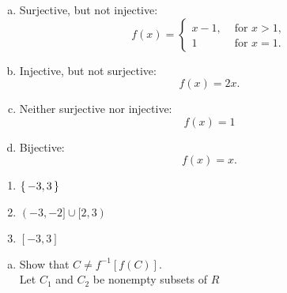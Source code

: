 \documentclass[12pt]{scrartcl} %
\begin{document}
\begin{enumerate}[(a)]
\item Surjective, but not injective:
\begin{equation}
f(x) = 
\begin{cases}
x - 1, & \text{ for } x > 1, \\
1 & \text{ for } x = 1.

\end{cases}
\end{equation}

\item Injective, but not surjective:
\begin{equation}
f(x) = 2x.
\end{equation}
\item Neither surjective nor injective:
\begin{equation}
f(x) = 1
\end{equation}
\item Bijective:
\begin{equation}
f(x) = x.
\end{equation}
\end{enumerate}
\begin{enumerate}([a])
\item $\set{-3, 3}$
\item $(-3, -2] \cup [2, 3)$
\item $[-3, 3]$
\end{enumerate}

\begin{enumerate}[(a)]
\item Show that $C \neq f^{-1}[f(C)]$. \\
Let $C_1$  and $C_2$ be nonempty subsets of $R$  

\end{enumerate}
\end{document}
